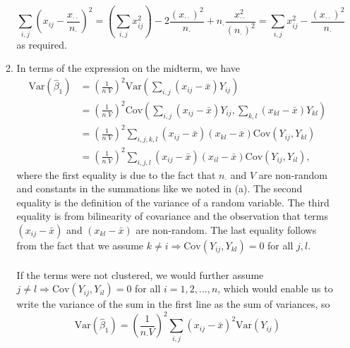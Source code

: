 \documentclass[11pt]{article}
\newcommand{\Var}{\mathrm{Var}}
\newcommand{\Cov}{\mathrm{Cov}}
\begin{document}
\begin{enumerate}
\begin{enumerate}
\[				\sum_{i,j} (x_{ij} - \frac{x_{\cdot\cdot}}{n_\cdot})^2 = (\sum_{i,j} x_{ij}^2) - 2 \frac{(x_{\cdot\cdot})^2}{n_\cdot} + n_\cdot\frac{x_{\cdot\cdot}^2}{(n_\cdot)^2} = \sum_{i,j} x_{ij}^2 - \frac{(x_{\cdot\cdot})^2}{n_\cdot}
			\]
			as required.
			\item In terms of the expression on the midterm, we have
			\begin{align*}
				\Var(\widehat{\beta}_1) &= \left(\frac{1}{n_\cdot V}\right)^2\Var\left(\sum_{i,j} (x_{ij}-\bar{x})Y_{ij}\right) \\
				&= \left(\frac{1}{n_\cdot V}\right)^2\Cov\left(\sum_{i,j} (x_{ij}-\bar{x})Y_{ij},\sum_{k,l}(x_{kl}-\bar{x})Y_{kl}\right) \\
				&= \left(\frac{1}{n_\cdot V}\right)^2\sum_{i,j,k,l} (x_{ij}-\bar{x})(x_{kl}-\bar{x})\Cov\left(Y_{ij},Y_{kl}\right) \\
				&=\left(\frac{1}{n_\cdot V}\right)^2\sum_{i,j,l} (x_{ij}-\bar{x})(x_{il}-\bar{x})\Cov\left(Y_{ij},Y_{il}\right),
			\end{align*}
			where the first equality is due to the fact that $n_\cdot$ and $V$ are non-random and constants in the summations like we noted in (a). The second equality is the definition of the variance of a random variable. The third equality is from bilinearity of covariance and the observation that terms $(x_{ij}-\bar{x})$ and $(x_{kl}-\bar{x})$ are non-random. The last equality follows from the fact that we assume $k\neq i \Rightarrow \Cov(Y_{ij},Y_{kl}) = 0 $ for all $j,l$. \\ \\If the terms were not clustered, we would further assume $j\neq l\Rightarrow \Cov(Y_{ij},Y_{il})=0$ for all $i=1,2,\dotsc,n$, which would enable us to write the variance of the sum in the first line as the sum of variances, so
			\[
				\Var(\widehat{\beta}_1) = \left(\frac{1}{n_\cdot V}\right)^2\sum_{i,j} (x_{ij}-\bar{x})^2\Var\left(Y_{ij}\right)
			\]
			

\end{enumerate}
\end{enumerate}
\end{document}

